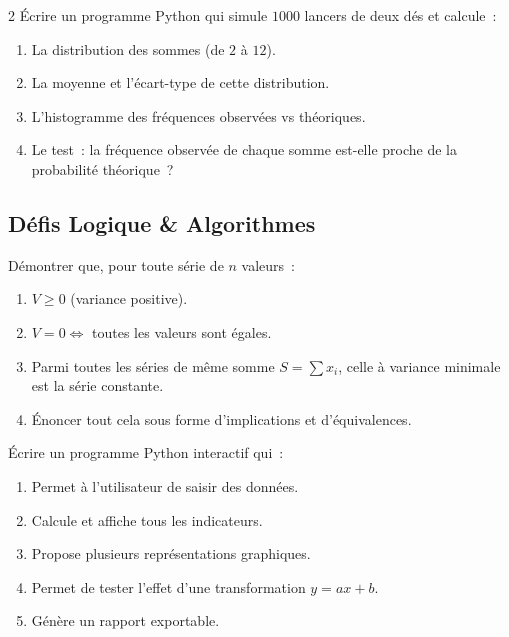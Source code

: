 \begin{probleme}{2}
\'Ecrire un programme Python qui simule $1000$ lancers de deux d\'es
et calcule~:
\begin{enumerate}
  \item La distribution des sommes (de $2$ \`a $12$).
  \item La moyenne et l'\'ecart-type de cette distribution.
  \item L'histogramme des fr\'equences observ\'ees vs th\'eoriques.
  \item Le test~: la fr\'equence observ\'ee de chaque somme est-elle
        proche de la probabilit\'e th\'eorique~?
\end{enumerate}
\end{probleme}

\subsection*{D\'efis Logique \& Algorithmes}

\begin{challenge}
D\'emontrer que, pour toute s\'erie de $n$ valeurs~:
\begin{enumerate}
  \item $V\geq0$ (variance positive).
  \item $V=0 \Leftrightarrow$ toutes les valeurs sont \'egales.
  \item Parmi toutes les s\'eries de m\^eme somme $S=\sum x_i$, celle \`a variance
        minimale est la s\'erie constante.
  \item \'Enoncer tout cela sous forme d'implications et d'\'equivalences.
\end{enumerate}
\end{challenge}

\begin{challenge}
\'Ecrire un programme Python interactif qui~:
\begin{enumerate}
  \item Permet \`a l'utilisateur de saisir des donn\'ees.
  \item Calcule et affiche tous les indicateurs.
  \item Propose plusieurs repr\'esentations graphiques.
  \item Permet de tester l'effet d'une transformation $y=ax+b$.
  \item G\'en\`ere un rapport exportable.
\end{enumerate}
\end{challenge}



\backmatter
